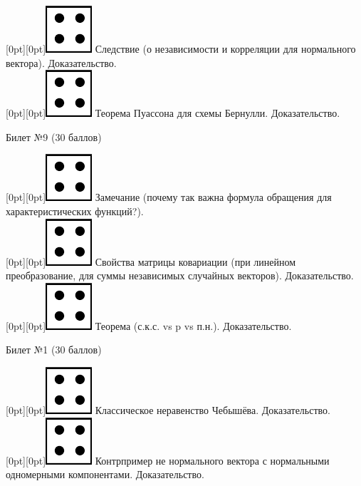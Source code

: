 \documentclass[10pt]{article}
\begin{document}
\raisebox{-1pt}[0pt][0pt]{\includegraphics[width=0.02\linewidth]{4.png}} Следствие (о независимости и корреляции для нормального вектора). Доказательство. \\ 

\raisebox{-1pt}[0pt][0pt]{\includegraphics[width=0.02\linewidth]{4.png}} Теорема Пуассона для схемы Бернулли. Доказательство. \\

\begin{center} {\Large Билет №9 (30 баллов)} \end{center}

\raisebox{-1pt}[0pt][0pt]{\includegraphics[width=0.02\linewidth]{4.png}} Замечание (почему так важна формула обращения для характеристических функций?). \\

\raisebox{-1pt}[0pt][0pt]{\includegraphics[width=0.02\linewidth]{4.png}} Свойства матрицы ковариации (при линейном преобразование, для суммы независимых случайных векторов). Доказательство. \\

\raisebox{-1pt}[0pt][0pt]{\includegraphics[width=0.02\linewidth]{4.png}} Теорема (с.к.с. vs p vs п.н.). Доказательство. \\ 

\begin{center} {\Large Билет №1 (30 баллов)} \end{center}

\raisebox{-1pt}[0pt][0pt]{\includegraphics[width=0.02\linewidth]{4.png}} Классическое неравенство Чебышёва. Доказательство. \\

\raisebox{-1pt}[0pt][0pt]{\includegraphics[width=0.02\linewidth]{4.png}} Контрпример не нормального вектора с нормальными одномерными компонентами. Доказательство. \\ 
\end{document}
